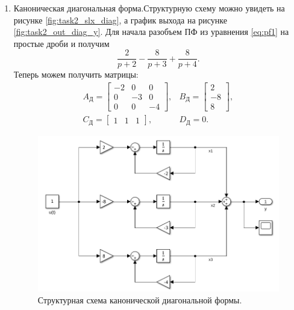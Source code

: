 \begin{enumerate}
    \item Каноническая диагональная форма.Структурную схему можно увидеть
    на рисунке \ref{fig:task2_slx_diag}, а график выхода на рисунке 
    \ref{fig:task2_out_diag_y}.
    Для начала разобъем ПФ из уравнения \ref{eq:pf1} на простые дроби и получим
    \begin{equation*}
        \frac{2}{p+2}-\frac{8}{p+3}+\frac{8}{p+4}.
    \end{equation*}
    Теперь можем получить матрицы:
    \begin{equation*}
        \begin{array}{cc}
            A_\text{Д}=\begin{bmatrix}
                -2 & 0 & 0 \\
                0 & -3 & 0 \\
                0 & 0 & -4
            \end{bmatrix}, &
            B_\text{Д}=\begin{bmatrix}
                2 \\ -8 \\ 8
            \end{bmatrix}, \\[7mm]
            C_\text{Д}=\begin{bmatrix}
                1 & 1 & 1
            \end{bmatrix}, &
            D_\text{Д}=0.
        \end{array}
    \end{equation*}
    \begin{figure}[htbp]
        \centering
        \includegraphics[width=\linewidth]{figs/task_2_slx_diag.png}
        \caption{Структурная схема канонической диагональной формы.}

\end{figure}
\end{enumerate}
